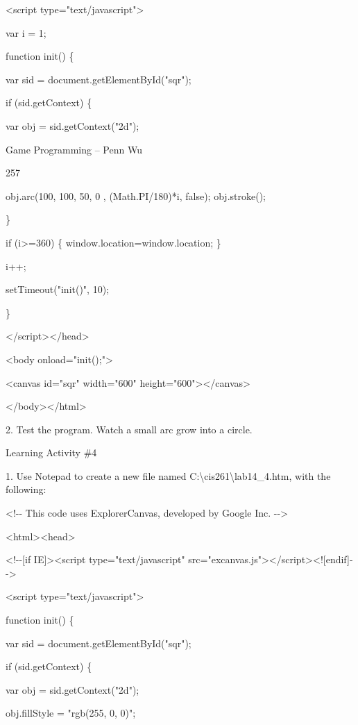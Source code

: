 \documentclass[
]{article}
\begin{document}
\textless script type="text/javascript"\textgreater{}

var i = 1;

function init() \{

var sid = document.getElementById("sqr");

if (sid.getContext) \{

var obj = sid.getContext("2d");

Game Programming -- Penn Wu

257

\protect\hypertarget{index_split_013.htmlux5cux23p258}{}{} obj.arc(100,
100, 50, 0 , (Math.PI/180)*i, false); obj.stroke();

\}

if (i\textgreater=360) \{ window.location=window.location; \}

i++;

setTimeout("init()", 10);

\}

\textless/script\textgreater\textless/head\textgreater{}

\textless body onload="init();"\textgreater{}

\textless canvas id="sqr" width="600"
height="600"\textgreater\textless/canvas\textgreater{}

\textless/body\textgreater\textless/html\textgreater{}

2. Test the program. Watch a small arc grow into a circle.

Learning Activity \#4

1. Use Notepad to create a new file named
C:\textbackslash cis261\textbackslash lab14\_4.htm, with the following:

\textless!-\/- This code uses ExplorerCanvas, developed by Google Inc.
-\/-\textgreater{}

\textless html\textgreater\textless head\textgreater{}

\textless!-\/-{[}if IE{]}\textgreater\textless script
type="text/javascript"
src="excanvas.js"\textgreater\textless/script\textgreater\textless!{[}endif{]}-\/-\textgreater{}

\textless script type="text/javascript"\textgreater{}

function init() \{

var sid = document.getElementById("sqr");

if (sid.getContext) \{

var obj = sid.getContext("2d");

obj.fillStyle = "rgb(255, 0, 0)";
\end{document}
